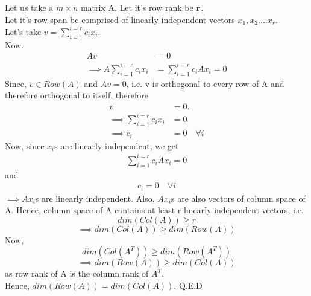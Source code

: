 \documentclass[12pt, a4paper]{article}
\begin{document}
\section{}
Let us take a $m \times n$ matrix A. Let it's row rank be $\textbf{r}$.\\
Let it's row span be comprised of linearly independent vectors $x_1,x_2....x_r.$\\
Let's take $v=\sum_{i=1}^{i=r}c_{i}x_{i}$.\\
Now.\\
\begin{align*}
    Av&=0\\
    \implies A\sum_{i=1}^{i=r}c_{i}x_{i}&=\sum_{i=1}^{i=r}c_{i}A x_{i}=0
\end{align*}
Since, $v\in Row(A)$ and $Av=0$, i.e. v is orthogonal to every row of A and therefore orthogonal to itself, therefore 
\begin{align*}
    v &= 0.\\
    \implies \sum_{i=1}^{i=r}c_{i}x_{i}&=0\\
    \implies c_i&=0  \quad \forall i
\end{align*}
Now, since $x_i$s are linearly independent, we get
\begin{align*}
\sum_{i=1}^{i=r}c_{i}A x_{i}=0
\end{align*}
and 
\begin{align*}
c_i=0 \quad\forall i
\end{align*}
$\implies Ax_i$s are linearly independent. Also, $Ax_i$s are also vectors of column space of A. Hence, column space of A contains at least r linearly independent vectors, i.e.
$$dim(Col(A))\geq r$$
$$\implies dim(Col(A)) \geq dim(Row(A))$$
Now,
$$ dim(Col(A^{T})) \geq dim(Row(A^{T}))$$
$$\implies dim(Row(A)) \geq dim(Col(A))$$
as row rank of A is the column rank of $A^T$.\\
Hence, $dim(Row(A))=dim(Col(A))$.
\hspace*{\fill} Q.E.D

\newpage
\end{document}
